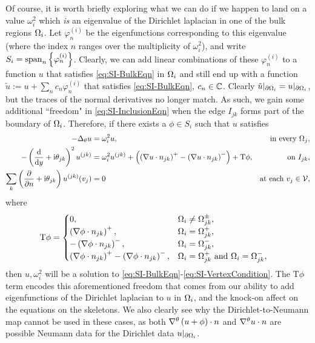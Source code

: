 Of course, it is worth briefly exploring what we can do if we happen to land on a value $\omega_i^2$ which \emph{is} an eigenvalue of the Dirichlet laplacian in one of the bulk regions $\Omega_i$.
Let $\varphi^{(i)}_n$ be the eigenfunctions corresponding to this eigenvalue (where the index $n$ ranges over the multiplicity of $\omega_i^2$), and write $S_i = \mathrm{span}_n\left\{ \varphi^{(i)}_n \right\}$.
Clearly, we can add linear combinations of these $\varphi^{(i)}_n$ to a function $u$ that satisfies \eqref{eq:SI-BulkEqn} in $\Omega_i$ and still end up with a function $\tilde{u} := u + \sum_{n}c_n\varphi^{(i)}_n$ that satisfies \eqref{eq:SI-BulkEqn}, $c_n\in\mathbb{C}$.
Clearly $\tilde{u}\vert_{\partial\Omega_i} = u\vert_{\partial\Omega_i}$, but the traces of the normal derivatives no longer match.
As such, we gain some additional ``freedom" in \eqref{eq:SI-InclusionEqn} when the edge $I_{jk}$ forms part of the boundary of $\Omega_i$.
Therefore, if there exists a $\phi\in S_i$ such that $u$ satisfies
\begin{subequations}
	\begin{align*}
		-\Delta_{\theta}u &= \omega_i^2 u, &\text{in every } \Omega_j, \\
		-\left( \dfrac{\mathrm{d}}{\mathrm{d}y} + \mathrm{i}\theta_{jk} \right)^2u^{(jk)}  
		&= \omega_i^2 u^{(jk)} + \left( \left( \nabla u\cdot n_{jk} \right)^+ - \left( \nabla u\cdot n_{jk} \right)^- \right) + \mathrm{T}\phi,
		&\text{on } I_{jk}, \\
		\sum_{k} \left( \dfrac{\partial }{\partial n}+\mathrm{i}\theta_{jk} \right) u^{(jk)}(v_j) 
		&= 0 
		&\text{at each } v_j\in\mathcal{V},
	\end{align*}
\end{subequations}
where
\begin{align*}
	\mathrm{T}\phi &=
	\begin{cases}
		0, & \Omega_i\neq\Omega_{jk}^{\pm}, \\
		\left( \nabla\phi\cdot n_{jk} \right)^+, & \Omega_i = \Omega_{jk}^+, \\
		-\left( \nabla\phi\cdot n_{jk} \right)^-, & \Omega_i = \Omega_{jk}^-, \\
		\left( \nabla\phi\cdot n_{jk} \right)^+ -\left( \nabla\phi\cdot n_{jk} \right)^-, & \Omega_i = \Omega_{jk}^+ \text{ and } \Omega_i = \Omega_{jk}^-,
	\end{cases}
\end{align*}
then $u, \omega_i^2$ will be a solution to \eqref{eq:SI-BulkEqn}-\eqref{eq:SI-VertexCondition}.
The $\mathrm{T}\phi$ term encodes this aforementioned freedom that comes from our ability to add eigenfunctions of the Dirichlet laplacian to $u$ in $\Omega_i$, and the knock-on affect on the equations on the skeletons.
We also clearly see why the Dirichlet-to-Neumann map cannot be used in these cases, as both $\nabla^{\theta}\left( u+\phi \right)\cdot n$ and $\nabla^{\theta} u\cdot n$ are possible Neumann data for the Dirichlet data $u\vert_{\partial\Omega_i}$.

